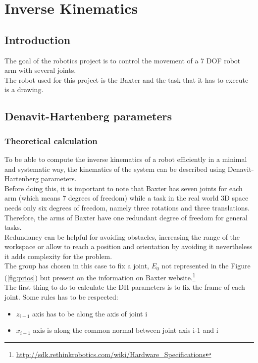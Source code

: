 \chapter{Inverse Kinematics}
\label{chap:inv kin}


\section{Introduction}

The goal of the robotics project is to control the movement of a 7 DOF robot arm with several joints.\\
The robot used for this project is the Baxter and the task that it has to execute is a drawing.


\section{Denavit-Hartenberg parameters}
\subsection{Theoretical calculation}
To be able to compute the inverse kinematics of a robot efficiently in a minimal and systematic way, the kinematics of the system can be described using Denavit-Hartenberg parameters. \\
Before doing this, it is important to note that Baxter has seven joints for each arm (which means 7 degrees of freedom) while a task in the real world 3D space needs only six degrees of freedom, namely three rotations and three translations. Therefore, the arms of Baxter have one redundant degree of freedom for general tasks.\\
Redundancy can be helpful for avoiding obstacles, increasing the range of the workspace or allow to reach a position and orientation by avoiding it nevertheless it adds complexity for the problem.\\
The group has chosen in this case to fix a joint, $E_0$ not represented in the Figure (\ref{fig:prios}) but present on the information on Baxter website.\footnote{\url{http://sdk.rethinkrobotics.com/wiki/Hardware\_Specifications}} \\

The first thing to do to calculate the DH parameters is to fix the frame of each joint. Some rules has to be respected: \\
\begin{itemize}
\item $z_{i-1}$ axis has to be along the axis of joint i
\item $x_{i-1}$ axis is along the common normal between joint axis i-1 and i
\end{itemize}

